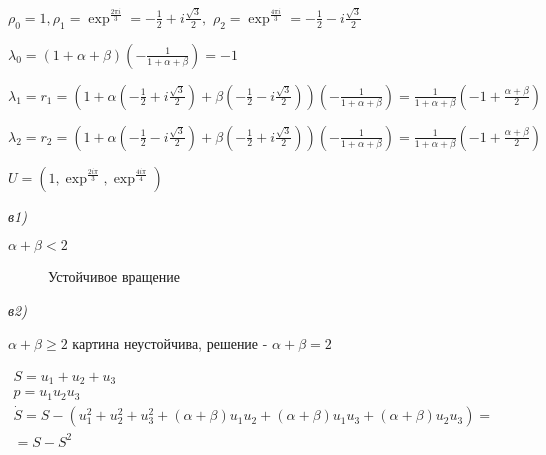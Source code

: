 \vspace{0.5cm}
\(
	\rho_0 = 1, \rho_1 = \exp^{\frac{2\pi i}{3}} = -\frac{1}{2}+i\frac{\sqrt{3}}{2},
\)\hspace{0.1cm}
\(
	\rho_2 = \exp^\frac{4\pi i}{3} = -\frac{1}{2} - i\frac{\sqrt{3}}{2}
\)

\vspace{0.5cm}
\(
\lambda_0 = (1 + \alpha + \beta)(-\frac{1}{1 + \alpha + \beta}) = -1
\)

\vspace{0.5cm}
\(
\lambda_1=r_1 = (1 + \alpha( -\frac{1}{2}+i\frac{\sqrt{3}}{2}) + \beta( -\frac{1}{2} - i\frac{\sqrt{3}}{2}))(-\frac{1}{1 + \alpha + \beta}) = \frac{1}{1 + \alpha + \beta}(-1+\frac{\alpha+\beta}{2})
\)

\vspace{0.5cm}
\(
\lambda_2 = r_2 = (1 + \alpha( -\frac{1}{2} - i\frac{\sqrt{3}}{2}) + \beta( -\frac{1}{2} + i\frac{\sqrt{3}}{2}))(-\frac{1}{1 + \alpha + \beta})=\frac{1}{1 + \alpha + \beta}(-1+\frac{\alpha+\beta}{2})
\)

\vspace{0.5cm}
\(
U = (1, \exp^\frac{2i\pi}{3}, \exp^\frac{4i\pi}{4})
\)

\vspace{0.5cm}
\textit{в1)}

\(
\alpha + \beta < 2
\)
\begin{figure} [h!]
			\caption{Устойчивое вращение}	
\end{figure}
\begin{figure} [h!]
			\caption{}	
\end{figure}

\vspace{0.5cm}
\textit{в2)}

\(
\alpha + \beta \geq 2
\)
\hspace{0.1cm} картина неустойчива, решение - \(\alpha + \beta = 2\)

\vspace{0.5cm}
\(
	\begin{matrix}
		S = u_1 + u_2 + u_3\\
		p = u_1u_2u_3
	\end{matrix}
\)\hspace{1cm}
\(
\begin{matrix}
	\dot{S} = S - (u_1^2 + u_2^2 + u_3^2 +(\alpha + \beta)u_1u_2 + (\alpha + \beta)u_1u_3 + (\alpha + \beta)u_2u_3) =\\ 
		= S - S^2
\end{matrix}
\)

